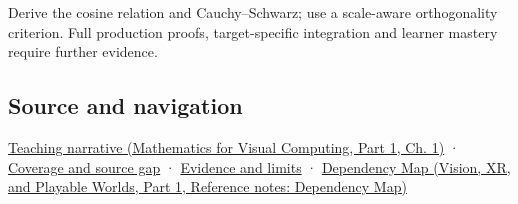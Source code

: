 Derive the cosine relation and Cauchy--Schwarz; use a scale-aware orthogonality criterion. Full production proofs, target-specific integration and learner mastery require further evidence.

\subsection{Source and navigation}\label{appendix-8bc4e8fc547c-source-and-navigation}

\hypertarget{appendix-8bc4e8fc547c-source-and-navigation}{}

\href{../02-Mathematics-for-Visual-Computing-P01/main.pdf\#01-foundations-i-ch017-the-dot-product-turns-two-movements-into-a-measurement}{Teaching narrative (Mathematics for Visual Computing, Part 1, Ch. 1)} · \hyperref[appendix-fd090d982a15-phase-6---parts-501-600]{Coverage and source gap} · \hyperref[appendix-a103e7846d21-phase-6---source-analysis-and-verification]{Evidence and limits} · \href{../07-Vision-XR-and-Playable-Worlds-P01/main.pdf\#appendix-4ad47bdd269a}{Dependency Map (Vision, XR, and Playable Worlds, Part 1, Reference notes: Dependency Map)}
